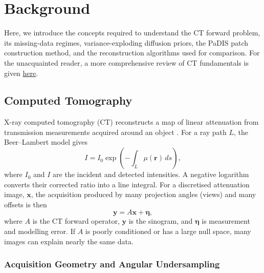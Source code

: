 \ifpdf     \graphicspath{{Sections/2_background_figs/Raster/}{Sections/2_background_figs/PDF/}{Sections/2_background_figs/}}
\else     \graphicspath{{Sections/2_background_figs/Vector/}{Sections/2_background_figs/}}
\fi

\chapter{Background}
\label{ch:background}

Here, we introduce the concepts required to understand the CT forward problem, its missing-data regimes, variance-exploding diffusion priors, the PaDIS patch construction method, and the reconstruction algorithms used for comparison. For the unacquainted reader, a more comprehensive review of CT fundamentals is given \href{https://github.com/THartigan/MPhil-Project/blob/main/CT_Basics.md}{here}.

\section{Computed Tomography}
\label{sec:basics}

X-ray computed tomography (CT) reconstructs a map of linear attenuation from transmission measurements acquired around an object \cite{guntoro_x-ray_2019}. For a ray path $L$, the Beer--Lambert model gives
\begin{equation}
I=I_0\exp\left(-\int_L \mu(\mathbf{r})\,ds\right),
\label{eq:beer_lambert}
\end{equation}
where $I_0$ and $I$ are the incident and detected intensities. A negative logarithm converts their corrected ratio into a line integral. For a discretised attenuation image, $\mathbf{x}$, the acquisition produced by many projection angles (views) and many offsets is then
\begin{equation}
\mathbf{y}=A\mathbf{x}+\boldsymbol{\eta},
\label{eq:ct_forward_model}
\end{equation}
where $A$ is the CT forward operator, $\mathbf{y}$ is the sinogram, and $\boldsymbol{\eta}$ is measurement and modelling error. If $A$ is poorly conditioned or has a large null space, many images can explain nearly the same data.

\subsection{Acquisition Geometry and Angular Undersampling}
\label{subsec:ct_geometry_sampling}

